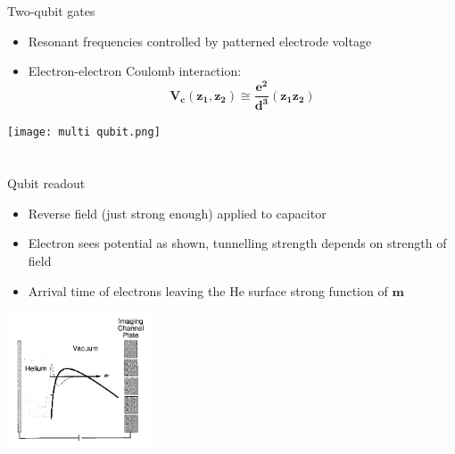\documentclass{beamer}
\begin{document}
\section{}
\begin{frame}[t]{Two-qubit gates}
    \begin{itemize}
        \item Resonant frequencies controlled by patterned electrode voltage
        \item Electron-electron Coulomb interaction:
        $$\mathbf{V_c (z_1,z_2) \cong \frac{e^2}{d^3}(z_1 z_2)}$$
    \end{itemize}
    \begin{center}
        \texttt{[image: multi qubit.png]}
    \end{center}
\end{frame}

\section{}
\begin{frame}[t]{Qubit readout}
    \begin{itemize}
        \item Reverse field (just strong enough) applied to capacitor
        \item Electron sees potential as shown, tunnelling strength depends on strength of field
        \item Arrival time of electrons leaving the He surface strong function of $\mathbf{m}$
    \end{itemize}
    \begin{center}
        \includegraphics[height=4cm]{images/readout.png}
    \end{center}
\end{frame}

\end{document}
